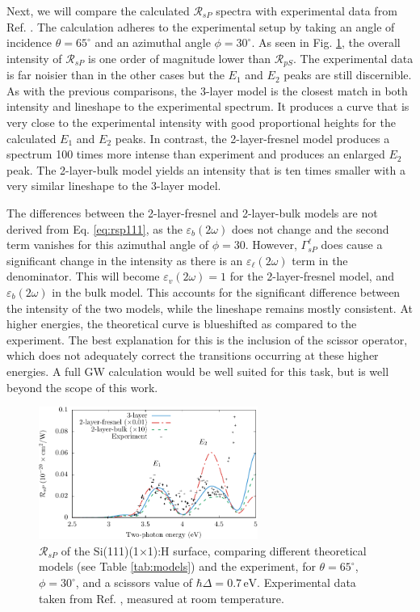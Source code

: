 Next, we will compare the calculated $\mathcal{R}_{sP}$ spectra with
experimental data from Ref. \cite{mejiaPRB02}. The calculation adheres to the
experimental setup by taking an angle of incidence $\theta=65^{\circ}$ and an
azimuthal angle $\phi=30^{\circ}$. As seen in Fig. \ref{fig:RsP}, the overall
intensity of $\mathcal{R}_{sP}$ is one order of magnitude lower than
$\mathcal{R}_{pS}$. The experimental data is far noisier than in the other cases
but the $E_{1}$ and $E_{2}$ peaks are still discernible. As with the previous
comparisons, the 3-layer model is the closest match in both intensity and
lineshape to the experimental spectrum. It produces a curve that is very close
to the experimental intensity with good proportional heights for the calculated
$E_{1}$ and $E_{2}$ peaks. In contrast, the 2-layer-fresnel model produces a
spectrum 100 times more intense than experiment and produces an enlarged $E_{2}$
peak. The 2-layer-bulk model yields an intensity that is ten times smaller with
a very similar lineshape to the 3-layer model.

The differences between the 2-layer-fresnel and 2-layer-bulk models are not
derived from Eq. \eqref{eq:rsp111}, as the $\varepsilon_{b}(2\omega)$ does not
change and the second term vanishes for this azimuthal angle of $\phi = 30$.
However, $\Gamma^{\ell}_{sP}$ does cause a significant change in the intensity
as there is an $\varepsilon_{\ell}(2\omega)$ term in the denominator. This will
become $\varepsilon_{v}(2\omega) = 1$ for the 2-layer-fresnel model, and
$\varepsilon_{b}(2\omega)$ in the bulk model. This accounts for the significant
difference between the intensity of the two models, while the lineshape remains
mostly consistent. At higher energies, the theoretical curve is blueshifted as
compared to the experiment. The best explanation for this is the inclusion of
the scissor operator, which does not adequately correct the transitions
occurring at these higher energies. A full GW calculation would be well suited
for this task, but is well beyond the scope of this work.

\begin{figure}[t]
\centering
\includegraphics[width=0.64\textwidth]{content/figures/fig-Si1x1-Mejia_RsP}
\caption[$\mathcal{R}_{sP}$ compared to experimental data from Mejia et al.]
{$\mathcal{R}_{sP}$ of the Si(111)(1$\times$1):H surface, comparing different
theoretical models (see Table \ref{tab:models}) and the experiment, for
$\theta=65^{\circ}$, $\phi=30^{\circ}$, and a scissors value of $\hbar\Delta =
0.7\,\text{eV}$. Experimental data taken from Ref.
\cite{mejiaPRB02}, measured at room temperature.}

\label{fig:RsP}
\end{figure}


